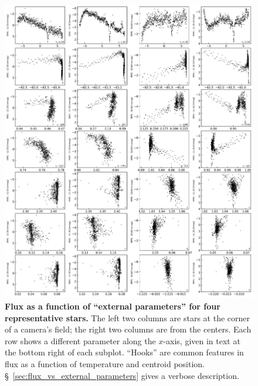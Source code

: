 \documentclass[12pt,twocolumn,tighten]{aastex62}
\begin{document}
\begin{figure}[t]
    \begin{center}
		\includegraphics[height=0.9\textheight]{mag_vs_epdparams.png}
    \end{center}
    \vspace{-0.5cm}
    \caption{
      {\bf Flux as a function of ``external parameters'' for four
      representative stars.} The left two columns are stars at the
      corner of a camera's field; the right two columns are from the
      centers.
      Each row shows a different parameter along the $x$-axis, given
      in text at the bottom right of each subplot.
      ``Hooks'' are common features in flux as a function of
      temperature and centroid position.
      \S~\ref{sec:flux_vs_external_parameters} gives a verbose
      description.
     \label{fig:flux_vs_external_parameters}
    }
\end{figure}
\end{document}
